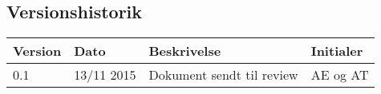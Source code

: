 \subsection{Versionshistorik}
\begin{center}
		\begin{longtable}{ | m{1.5cm} | m{2cm}| m{7.5cm}| m{2cm}| } 
			\hline
			\textbf{Version} & \textbf{Dato} &  \textbf{Beskrivelse} & \textbf{Initialer}  \\ 
			\hline
			0.1  & 13/11 2015 & Dokument sendt til review & AE og AT \\
			\hline
		\end{longtable}	
	\end{center}